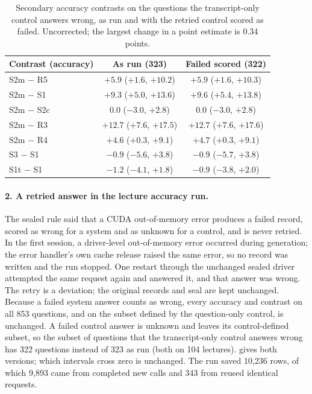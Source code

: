 \begin{table}[t]
\centering
\small
\setlength{\tabcolsep}{3pt}
\begin{tabular}{@{}lcc@{}}
\toprule
Contrast (accuracy) & As run (323) & Failed scored (322) \\
\midrule
S2m $-$ R5 & $+5.9$ ($+1.6$, $+10.2$) & $+5.9$ ($+1.6$, $+10.3$) \\
S2m $-$ S1 & $+9.3$ ($+5.0$, $+13.6$) & $+9.6$ ($+5.4$, $+13.8$) \\
S2m $-$ S2c & $0.0$ ($-3.0$, $+2.8$) & $0.0$ ($-3.0$, $+2.8$) \\
S2m $-$ R3 & $+12.7$ ($+7.6$, $+17.5$) & $+12.7$ ($+7.6$, $+17.6$) \\
S2m $-$ R4 & $+4.6$ ($+0.3$, $+9.1$) & $+4.7$ ($+0.3$, $+9.1$) \\
S3 $-$ S1 & $-0.9$ ($-5.6$, $+3.8$) & $-0.9$ ($-5.7$, $+3.8$) \\
S1t $-$ S1 & $-1.2$ ($-4.1$, $+1.8$) & $-0.9$ ($-3.8$, $+2.0$) \\
\bottomrule
\end{tabular}
\caption{Secondary accuracy contrasts on the questions the transcript-only control answers wrong, as run and with the retried control scored as failed. Uncorrected; the largest change in a point estimate is 0.34 points.}
\label{tab:s-retry}
\end{table}

\paragraph{2. A retried answer in the lecture accuracy run.}
The sealed rule said that a CUDA out-of-memory error produces a failed record, scored as wrong for a system and as unknown for a control, and is never retried.
In the first session, a driver-level out-of-memory error occurred during generation; the error handler's own cache release raised the same error, so no record was written and the run stopped.
One restart through the unchanged sealed driver attempted the same request again and answered it, and that answer was wrong.
The retry is a deviation; the original records and seal are kept unchanged.
Because a failed system answer counts as wrong, every accuracy and contrast on all 853 questions, and on the subset defined by the question-only control, is unchanged.
A failed control answer is unknown and leaves its control-defined subset, so the subset of questions that the transcript-only control answers wrong has 322 questions instead of 323 as run (both on 104 lectures).
 gives both versions; which intervals cross zero is unchanged.
The run saved 10,236 rows, of which 9,893 came from completed new calls and 343 from reused identical requests.


